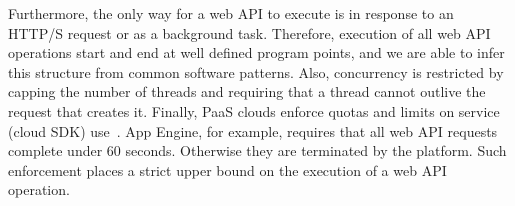 Furthermore, the only way for a web API to execute is in response
to an HTTP/S request or as a background task.  Therefore, execution of
all web API operations start and end at well defined program points, and
we are able to infer this structure from common software patterns.  Also,
concurrency is restricted by capping the number of threads
and requiring that a thread cannot outlive the request
that creates it.  Finally, PaaS clouds enforce quotas and limits on service
(cloud SDK) use~\cite{azure-limits,gae-limits,gae-sandbox}.
App Engine, for example, requires that all web API requests complete under 60 seconds.
Otherwise they are terminated by the platform. 
Such enforcement places a strict upper bound on the
execution of a web API operation.
